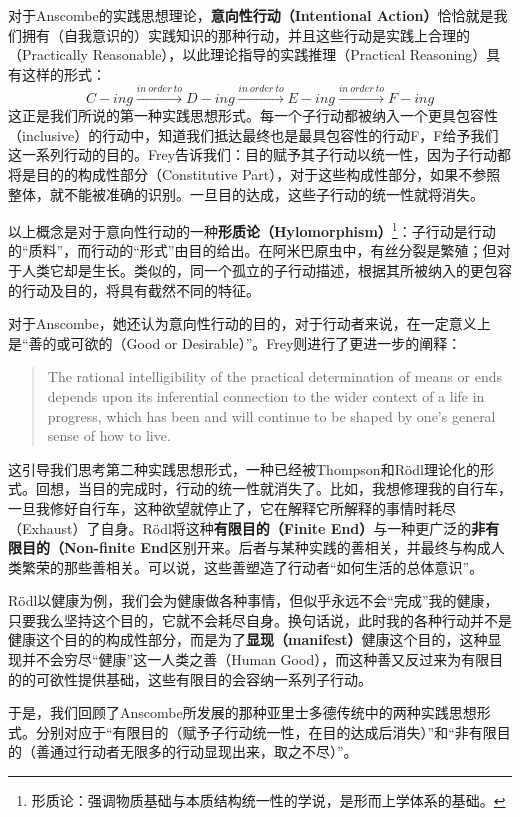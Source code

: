 \documentclass[12pt, a4paper, oneside]{ctexart}
\renewcommand{\b}{\textbf}
\newcommand{\f}{\footnote}
\newcounter{ans}[section]
\begin{document}
对于Anscombe的实践思想理论，\b{意向性行动（Intentional Action）}恰恰就是我们拥有（自我意识的）实践知识的那种行动，并且这些行动是实践上合理的（Practically Reasonable），以此理论指导的实践推理（Practical Reasoning）具有这样的形式：
\[
C-ing \xrightarrow{in\ order\ to} D-ing \xrightarrow{in\ order\ to} E-ing \xrightarrow{in\ order\ to} F-ing
\]
这正是我们所说的第一种实践思想形式。每一个子行动都被纳入一个更具包容性（inclusive）的行动中，知道我们抵达最终也是最具包容性的行动F，F给予我们这一系列行动的目的。Frey告诉我们：目的赋予其子行动以统一性，因为子行动都将是目的的构成性部分（Constitutive Part），对于这些构成性部分，如果不参照整体，就不能被准确的识别。一旦目的达成，这些子行动的统一性就将消失。

以上概念是对于意向性行动的一种\b{形质论（Hylomorphism）}\f{形质论：强调物质基础与本质结构统一性的学说，是形而上学体系的基础。}：子行动是行动的“质料”，而行动的“形式”由目的给出。在阿米巴原虫中，有丝分裂是繁殖；但对于人类它却是生长。类似的，同一个孤立的子行动描述，根据其所被纳入的更包容的行动及目的，将具有截然不同的特征。

对于Anscombe，她还认为意向性行动的目的，对于行动者来说，在一定意义上是“善的或可欲的（Good or Desirable）”。Frey则进行了更进一步的阐释：
\begin{quote}\small
The rational intelligibility of the practical determination of means or ends depends upon its inferential connection to the wider context of a life in progress, which has been and will continue to be shaped by one's general sense of how to live.
\end{quote}

这引导我们思考第二种实践思想形式，一种已经被Thompson和Rödl理论化的形式。回想，当目的完成时，行动的统一性就消失了。比如，我想修理我的自行车，一旦我修好自行车，这种欲望就停止了，它在解释它所解释的事情时耗尽（Exhaust）了自身。Rödl将这种\b{有限目的（Finite End）}与一种更广泛的\b{非有限目的（Non-finite End}区别开来。后者与某种实践的善相关，并最终与构成人类繁荣的那些善相关。可以说，这些善塑造了行动者“如何生活的总体意识”。

Rödl以健康为例，我们会为健康做各种事情，但似乎永远不会“完成”我的健康，只要我么坚持这个目的，它就不会耗尽自身。换句话说，此时我的各种行动并不是健康这个目的的构成性部分，而是为了\b{显现（manifest）}健康这个目的，这种显现并不会穷尽“健康”这一人类之善（Human Good），而这种善又反过来为有限目的的可欲性提供基础，这些有限目的会容纳一系列子行动。

于是，我们回顾了Anscombe所发展的那种亚里士多德传统中的两种实践思想形式。分别对应于“有限目的（赋予子行动统一性，在目的达成后消失）”和“非有限目的（善通过行动者无限多的行动显现出来，取之不尽）”。
\end{document}
